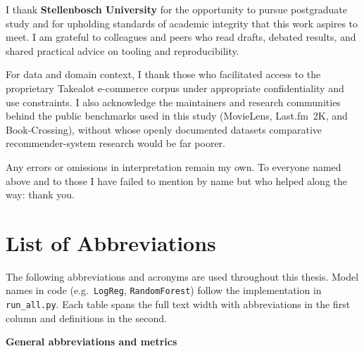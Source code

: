 \documentclass[11pt,a4paper]{report}
\begin{document}
I thank \textbf{Stellenbosch University} for the opportunity to pursue postgraduate study and for upholding standards of academic integrity that this work aspires to meet. I am grateful to colleagues and peers who read drafts, debated results, and shared practical advice on tooling and reproducibility.

For data and domain context, I thank those who facilitated access to the proprietary Takealot e-commerce corpus under appropriate confidentiality and use constraints. I also acknowledge the maintainers and research communities behind the public benchmarks used in this study (MovieLens, Last.fm~2K, and Book-Crossing), without whose openly documented datasets comparative recommender-system research would be far poorer.

Any errors or omissions in interpretation remain my own. To everyone named above and to those I have failed to mention by name but who helped along the way: thank you.

\tableofcontents
\newpage
\listoffigures
\listoftables

\chapter*{List of Abbreviations}

\noindent The following abbreviations and acronyms are used throughout this thesis. Model names in code (e.g.\ \texttt{LogReg}, \texttt{RandomForest}) follow the implementation in \texttt{run\_all.py}. Each table spans the full text width with abbreviations in the first column and definitions in the second.

\vspace{0.75em}
\noindent\textbf{General abbreviations and metrics}
\vspace{0.35em}
\end{document}
